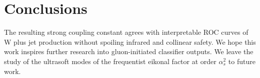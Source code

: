 \section{Conclusions}\label{sec:conclusions}

The resulting strong coupling constant agrees with interpretable ROC
curves of W plus jet production without spoiling infrared and collinear
safety. We hope this work inspires further research into gluon-initiated
classifier outputs. We leave the study of the ultrasoft modes of the
frequentist eikonal factor at order $\alpha_s^2$ to future work.

